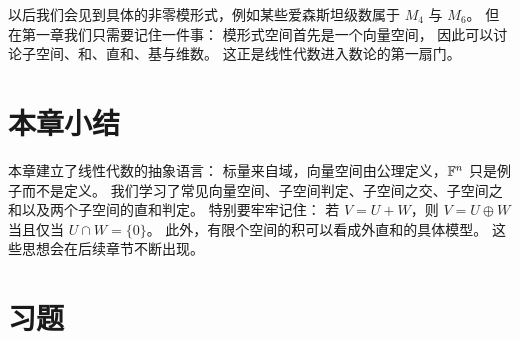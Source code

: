 \begin{example} 以后我们会见到具体的非零模形式，例如某些爱森斯坦级数属于 $M_4$ 与 $M_6$。
但在第一章我们只需要记住一件事： 模形式空间首先是一个向量空间，
因此可以讨论子空间、和、直和、基与维数。 这正是线性代数进入数论的第一扇门。
\end{example}

\section*{本章小结}

本章建立了线性代数的抽象语言： 标量来自域，向量空间由公理定义，$\mathbb{F}^n$ 只是例子而不是定义。
我们学习了常见向量空间、子空间判定、子空间之交、子空间之和以及两个子空间的直和判定。 特别要牢牢记住：
若 $V=U+W$，则 $V=U\oplus W$ 当且仅当 $U\cap W=\{0\}$。 此外，有限个空间的积可以看成外直和的具体模型。
这些思想会在后续章节不断出现。

\section*{习题}

